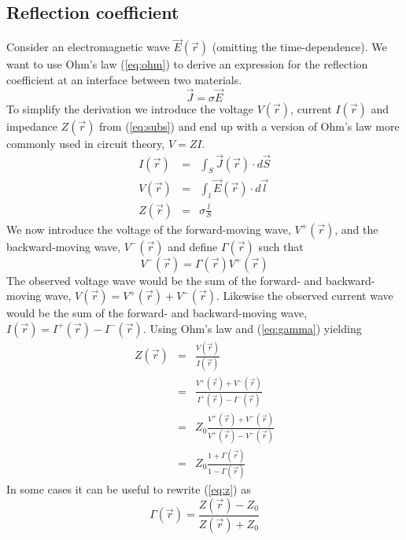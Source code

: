 \documentclass[12pt,a4paper]{article}
\begin{document}
\subsection{Reflection coefficient}\label{sec:refl}
Consider an electromagnetic wave $\vec{E}(\vec{r})$ (omitting the time-dependence). We want to use Ohm's law (\ref{eq:ohm}) to derive an expression for the reflection coefficient at an interface between two materials.
\begin{equation}
  \vec{J}=\sigma\vec{E}
  \label{eq:ohm}
\end{equation}
To simplify the derivation we introduce the voltage $V(\vec{r})$, current $I(\vec{r})$ and impedance $Z(\vec{r})$ from (\ref{eq:subs}) and end up with a version of Ohm's law more commonly used in circuit theory, $V=ZI$.
\begin{equation}
  \begin{array}{lll}
    I(\vec{r}) & = & \int_S \vec{J}(\vec{r})\cdot d\vec{S} \\
    V(\vec{r}) & = & \int_l \vec{E}(\vec{r})\cdot d\vec{l} \\
    Z(\vec{r}) & = & \sigma\frac{l}{S}
  \end{array}
  \label{eq:subs}
\end{equation}
We now introduce the voltage of the forward-moving wave, $V^{+}(\vec{r})$, and the backward-moving wave, $V^{-}(\vec{r})$ and define $\Gamma(\vec{r})$ such that
\begin{equation}
  V^{-}(\vec{r})=\Gamma(\vec{r}) V^{+}(\vec{r})
  \label{eq:gamma}
\end{equation}
The observed voltage wave would be the sum of the forward- and backward-moving wave, $V(\vec{r})=V^{+}(\vec{r})+V^{-}(\vec{r})$. Likewise the observed current wave would be the sum of the forward- and backward-moving wave, $I(\vec{r})=I^{+}(\vec{r})-I^{-}(\vec{r})$. Using Ohm's law and (\ref{eq:gamma}) yielding
\begin{equation}
  \begin{array}{lll}
    Z(\vec{r}) & = & \frac{V(\vec{r})}{I(\vec{r})} \\
         & = & \frac{V^{+}(\vec{r})+V^{-}(\vec{r})}{I^{+}(\vec{r})-I^{-}(\vec{r})} \\
         & = & Z_{0}\frac{V^{+}(\vec{r})+V^{-}(\vec{r})}{V^{+}(\vec{r})-V^{-}(\vec{r})} \\
         & = & Z_{0}\frac{1+\Gamma(\vec{r})}{1-\Gamma(\vec{r})}
  \end{array}
  \label{eq:z}
\end{equation}
In some cases it can be useful to rewrite (\ref{eq:z}) as
\begin{equation}
  \Gamma(\vec{r})=\frac{Z(\vec{r})-Z_{0}}{Z(\vec{r})+Z_{0}}
  \label{eq:gamma_2}
\end{equation}
\end{document}
